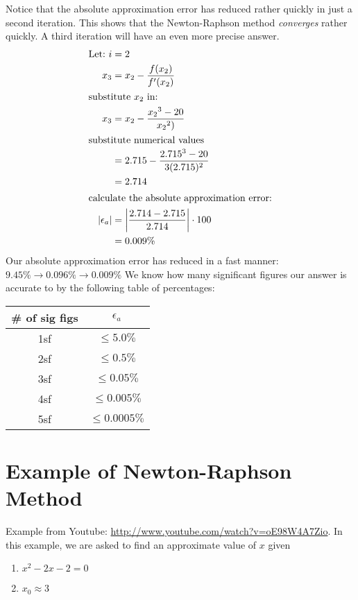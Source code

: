 \noindent Notice that the absolute approximation error has reduced rather
quickly in just a second iteration. This shows that the Newton-Raphson method
\emph{converges} rather quickly. A third iteration will have an even more
precise answer.
\begin{align}
  \text{Let:} ~
    i &= 2 \nonumber \\
  x_3 &= x_2 - \frac{f(x_{2})}{f'(x_{2})} \\
\intertext{substitute $x_2$ in:}
  x_3 &= x_2 - \frac{{x_{2}}^3-20}{{x_{2}}^2)} \\
\intertext{substitute numerical values}
      &= 2.715 - \frac{{2.715}^3 -20}{3(2.715)^2} \\
      &= 2.714 \\
\intertext{calculate the absolute approximation error:}
  |\epsilon_a| &= \left|\frac{2.714 -2.715}{2.714}\right| \cdot 100 \label{eq:absApproxErrorExample} \\
      &= 0.009\%
\end{align}
\noindent Our absolute approximation error has reduced in a fast manner:
$9.45\% \to 0.096\% \to 0.009\%$
We know how many significant figures our answer is accurate to by the following
table of percentages: 
\begin{table}[!htb]
\label{tab:significant figures of accuracy in terms of approximation error}
\begin{tabularx}{\linewidth}{c c} \hline
\# of sig figs & $\epsilon_a$ \\
\hline \hline
1sf & $\leq 5.0\%$ \\
2sf & $\leq 0.5\%$ \\
3sf & $\leq 0.05\%$ \\
4sf & $\leq 0.005\%$ \\
5sf & $\leq 0.0005\%$ \\
\end{tabularx}
\end{table}

\section{Example of Newton-Raphson Method}
\noindent Example from Youtube:
\url{http://www.youtube.com/watch?v=oE98W4A7Zio}. In this example, we are asked
to find an approximate value of $x$ given
\begin{enumerate}
  \item $x^2 - 2x -2 = 0$
  \item $x_0 \approx 3$
\end{enumerate}

